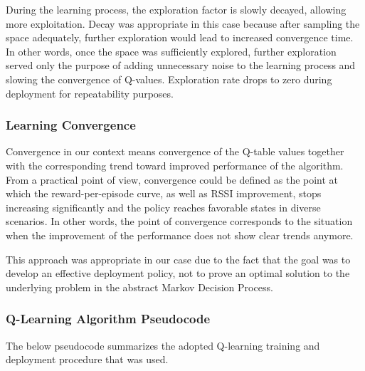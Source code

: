 During the learning process, the exploration factor is slowly decayed, allowing more exploitation.
Decay was appropriate in this case because after sampling the space adequately, further
exploration would lead to increased convergence time. In other words, once the space was
sufficiently explored, further exploration served only the purpose of adding unnecessary noise
to the learning process and slowing the convergence of Q-values. Exploration rate drops
to zero during deployment for repeatability purposes.

\subsubsection{Learning Convergence}

Convergence in our context means convergence of the Q-table values together with the
corresponding trend toward improved performance of the algorithm. From a practical point
of view, convergence could be defined as the point at which the reward-per-episode curve,
as well as RSSI improvement, stops increasing significantly and the policy reaches favorable
states in diverse scenarios. In other words, the point of convergence corresponds to the
situation when the improvement of the performance does not show clear trends anymore.

This approach was appropriate in our case due to the fact that the goal was to develop an
effective deployment policy, not to prove an optimal solution to the underlying problem in
the abstract Markov Decision Process.

\subsubsection{Q-Learning Algorithm Pseudocode}

The below pseudocode summarizes the adopted Q-learning training and deployment procedure that was used.

